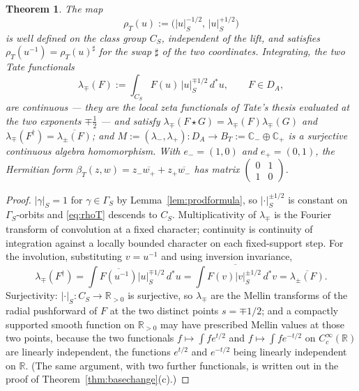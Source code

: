 \documentclass[11pt]{amsart}
\newtheorem{theorem}{Theorem}[section]
\theoremstyle{definition}
\theoremstyle{remark}
\newcommand{\C}{\mathbb C}
\newcommand{\R}{\mathbb R}
\newcommand{\dstar}{\,d^{*}}
\newcommand{\DA}{D_A}
\newcommand{\BT}{B_T}
\begin{document}
\begin{theorem}\label{thm:tate}
The map
\begin{equation}\label{eq:rhoT}
\rho_T(u):=\bigl(|u|_S^{-1/2},\,|u|_S^{+1/2}\bigr)
\end{equation}
is well defined on the class group $C_S$, independent of the lift, and
satisfies $\rho_T(u^{-1})=\rho_T(u)^{\sharp}$ for the swap $\sharp$ of the two
coordinates.  Integrating, the two \emph{Tate functionals}
\begin{equation}\label{eq:lambdadef}
\lambda_{\mp}(F):=\int_{C_S}F(u)\,|u|_S^{\mp1/2}\dstar u,\qquad F\in\DA,
\end{equation}
are continuous --- they are the local zeta functionals of Tate's thesis
\cite{Tate} evaluated at the two exponents $\mp\tfrac12$ --- and satisfy
$\lambda_{\mp}(F\star G)=\lambda_{\mp}(F)\lambda_{\mp}(G)$ and
$\lambda_{\mp}(F^{\dagger})=\overline{\lambda_{\pm}(F)}$; and
$M:=(\lambda_-,\lambda_+):\DA\to\BT:=\C_-\oplus\C_+$ is a surjective
continuous algebra homomorphism.  With $e_-=(1,0)$ and $e_+=(0,1)$, the
Hermitian form
$\beta_T(z,w)=z_-\overline{w_+}+z_+\overline{w_-}$ has matrix
$\left(\begin{smallmatrix}0&1\\1&0\end{smallmatrix}\right)$.
\end{theorem}

\begin{proof}
$|\gamma|_S=1$ for $\gamma\in\Gamma_S$ by Lemma~\ref{lem:prodformula}, so
$|\cdot|_S^{\pm1/2}$ is constant on $\Gamma_S$-orbits and \eqref{eq:rhoT}
descends to $C_S$.  Multiplicativity of $\lambda_{\mp}$ is the Fourier
transform of convolution at a fixed character; continuity is continuity of
integration against a locally bounded character on each fixed-support step.
For the involution, substituting $v=u^{-1}$ and using inversion invariance,
\[
\lambda_{\mp}(F^{\dagger})=\int\overline{F(u^{-1})}|u|_S^{\mp1/2}\dstar u
=\overline{\int F(v)|v|_S^{\pm1/2}\dstar v}=\overline{\lambda_{\pm}(F)}.
\]
Surjectivity: $|\cdot|_S:C_S\to\R_{>0}$ is surjective, so $\lambda_{\mp}$ are
the Mellin transforms of the radial pushforward of $F$ at the two distinct
points $s=\mp1/2$; and a compactly supported smooth function on $\R_{>0}$ may
have prescribed Mellin values at those two points, because the two functionals
$f\mapsto\int fe^{t/2}$ and $f\mapsto\int fe^{-t/2}$ on $C_c^{\infty}(\R)$ are
linearly independent, the functions $e^{t/2}$ and $e^{-t/2}$ being linearly
independent on $\R$.  (The same argument, with two further functionals, is
written out in the proof of Theorem~\ref{thm:basechange}(c).)
\end{proof}
\end{document}
